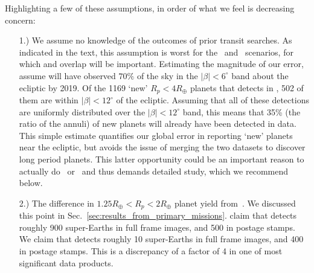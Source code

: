 Highlighting a few of these assumptions, in order of what we feel is decreasing
concern:
\begin{itemize}
\item [1.) We assume no knowledge of the outcomes of prior transit searches.]
  	As indicated in the text, this assumption is worst for the
        \elong\ and \eshort\ scenarios, for which \ktwo and \tesss
        overlap will be important.  Estimating the magnitude of our
        error, assume \ktwo will have observed $70\%$ of the sky in
        the $|\beta|<6^\circ$ band about the ecliptic by 2019.  Of the
        1169 `new' $R_p<4R_\oplus$ planets that \tess detects in
        \elong, 502 of them are within $|\beta|<12^\circ$ of the
        ecliptic.  Assuming that all of these detections are uniformly
        distributed over the $|\beta|<12^\circ$ band, this means that
        35\% (the ratio of the annuli) of \tesss new planets will
        already have been detected in \ktwo data.  This simple
        estimate quantifies our global error in reporting `new'
        planets near the ecliptic, but avoids the issue of merging the
        two datasets to discover long period planets.  This latter
        opportunity could be an important reason to actually do
        \elong\ or \eshort\ and thus demands detailed study, which we
        recommend below.
	
	\item [2.) The difference in $1.25R_\oplus<R_p<2R_\oplus$
          planet yield from~\protect\citetalias{Sullivan_2015}.]  We
          discussed this point in
          Sec.~\ref{sec:results_from_primary_missions}.
           claim that \tess detects roughly
          900 super-Earths in full frame images, and 500 in postage
          stamps.  We claim that \tess detects roughly 10 super-Earths
          in full frame images, and 400 in postage stamps.  This is a
          discrepancy of a factor of 4 in one of \tesss most
          significant data products.
        

\end{itemize}
